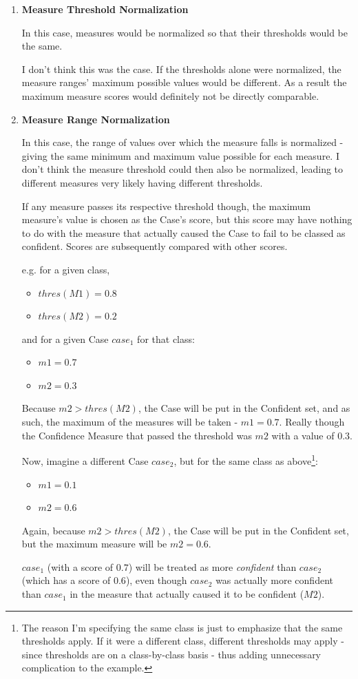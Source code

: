 \documentclass[a4paper,11pt]{report}
\begin{document}
\begin{enumerate}
	\item \textbf{Measure Threshold Normalization}
	
	In this case, measures would be normalized so that their thresholds would be the same.
	
	I don't think this was the case. If the thresholds alone were normalized, the measure ranges' maximum possible values would be different. As a result the maximum measure scores would definitely not be directly comparable.
	
	\item \textbf{Measure Range Normalization}
	
	In this case, the range of values over which the measure falls is normalized - giving the same minimum and maximum value possible for each measure. I don't think the measure threshold could then also be normalized, leading to different measures very likely having different thresholds. 
	
	If any measure passes its respective threshold though, the maximum measure's value is chosen as the Case's score, but this score may have nothing to do with the measure that actually caused the Case to fail to be classed as confident. Scores are subsequently compared with other scores.
	
	e.g. for a given class, 
	\begin{itemize}
		\item $thres(M1) = 0.8$
		\item $thres(M2) = 0.2$
	\end{itemize}
	and for a given Case $case_{1}$ for that class:
	\begin{itemize}
		\item $m1 = 0.7$
		\item $m2 = 0.3$
	\end{itemize}  
	
	Because $m2 > thres(M2)$, the Case will be put in the Confident set, and as such, the maximum of the measures will be taken - $m1=0.7$. Really though the Confidence Measure that passed the threshold was $m2$ with a value of $0.3$.
	
	Now, imagine a different Case $case_{2}$, but for the same class as above\footnote{The reason I'm specifying the same class is just to emphasize that the same thresholds apply. If it were a different class, different thresholds may apply - since thresholds are on a class-by-class basis - thus adding unnecessary complication to the example.}:
	\begin{itemize}
		\item $m1 = 0.1$
		\item $m2 = 0.6$
	\end{itemize}
	Again, because $m2 > thres(M2)$, the Case will be put in the Confident set, but the maximum measure will be $m2 = 0.6$. 
	
	$case_{1}$ (with a score of $0.7$) will be treated as more \emph{confident} than $case_{2}$ (which has a score of $0.6$), even though $case_{2}$ was actually more confident than $case_{1}$ in the measure that actually caused it to be confident ($M2$).
	
\end{enumerate}
\end{document}
